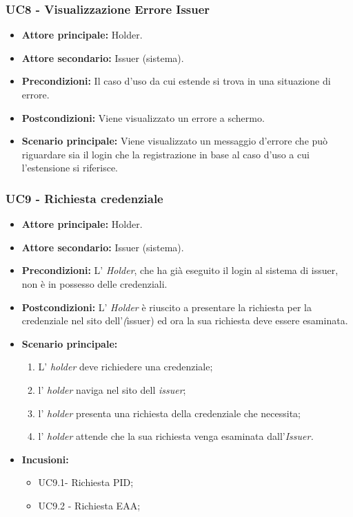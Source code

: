\subsubsection{UC8 - Visualizzazione Errore Issuer}
\begin{itemize}
\item \textbf{Attore principale:} Holder.
\item \textbf{Attore secondario:} Issuer (sistema).
\item \textbf{Precondizioni:} Il caso d'uso da cui estende si trova in una situazione di errore.
\item \textbf{Postcondizioni:} Viene visualizzato un errore a schermo. 
\item \textbf{Scenario principale:} Viene visualizzato un messaggio d’errore che può riguardare sia il login che la registrazione in base al caso d’uso a cui l’estensione si riferisce.
\end{itemize}

\subsubsection{UC9 - Richiesta credenziale}
\begin{itemize}
\item \textbf{Attore principale:} Holder.
\item \textbf{Attore secondario:} Issuer (sistema). 
\item \textbf{Precondizioni:} L’ \textit{Holder}, che ha già eseguito il login al sistema di issuer, non è in possesso delle credenziali.
\item \textbf{Postcondizioni:} L’ \textit{Holder} è riuscito a presentare la richiesta per la credenziale nel sito dell'\textit(issuer) ed ora la sua richiesta deve essere esaminata.
\item \textbf{Scenario principale:} 
    \begin{enumerate}
        \item L' \textit{holder} deve richiedere una credenziale; 
        \item l' \textit{holder} naviga nel sito dell \textit{issuer};
        \item l' \textit{holder} presenta una richiesta della credenziale che necessita;
        \item l' \textit{holder} attende che la sua richiesta venga esaminata dall'\textit{Issuer.}
    \end{enumerate}
\item \textbf{Incusioni:}
    \begin{itemize}
    \item UC9.1- Richiesta PID;
    \item UC9.2 - Richiesta EAA;
    \end{itemize}
\end{itemize}

